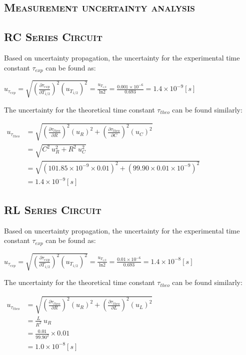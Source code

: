 \documentclass[a4paper,12pt]{article}
\begin{document}

\begin{appendices} 
\section{\textsc{Measurement uncertainty analysis}} 
\subsection{\textsc{RC Series Circuit}}
Based on uncertainty propagation, the uncertainty for the experimental time constant $ \tau_{exp} $ can be found as:
\begin{center}
$ \displaystyle u_{\tau_{exp}} = \sqrt{(\frac{\partial \tau_{exp}}{\partial T_{1/2}})^2(u_{T_{1/2}})^2} = \frac{u_{T_{1/2}}}{\text{ln}2} = \frac{0.001\times 10^{-6}}{0.693} = 1.4 \times 10^{-9} [s] $
\end{center}
The uncertainty for the theoretical time constant $ \tau_{theo} $ can be found similarly:
\begin{center}
$ \displaystyle  
\begin{aligned} 
	u_{\tau_{theo}} &= \sqrt{(\frac{\partial \tau_{theo}}{\partial R})^2(u_R)^2 + (\frac{\partial \tau_{theo}}{\partial C})^2(u_C)^2} \\ 
		&= \sqrt{C^2~u_R^2 + R^2~u_C^2} \\ 
		&= \sqrt{(101.85 \times 10^{-9} \times 0.01)^2 + (99.90 \times 0.01 \times 10^{-9})^2} \\
		&= 1.4 \times 10^{-9} [s] 
\end{aligned}$
\end{center}

\subsection{\textsc{RL Series Circuit}}
Based on uncertainty propagation, the uncertainty for the experimental time constant $ \tau_{exp} $ can be found as:
\begin{center}
$ \displaystyle u_{\tau_{exp}} = \sqrt{(\frac{\partial \tau_{exp}}{\partial T_{1/2}})^2(u_{T_{1/2}})^2} = \frac{u_{T_{1/2}}}{\text{ln}2} = \frac{0.01\times 10^{-6}}{0.693} = 1.4 \times 10^{-8} [s] $
\end{center}
The uncertainty for the theoretical time constant $ \tau_{theo} $ can be found similarly:
\begin{center}
$ \displaystyle  
\begin{aligned} 
	u_{\tau_{theo}} &= \sqrt{(\frac{\partial \tau_{theo}}{\partial R})^2(u_R)^2 + (\frac{\partial \tau_{theo}}{\partial L})^2(u_L)^2} \\ 
		&= \frac{L}{R^2}~u_R \\ 
		&= \frac{0.01}{99.90^2}\times 0.01 \\
		&= 1.0 \times 10^{-8} [s] 
\end{aligned}$
\end{center}


\end{appendices}
\end{document}

